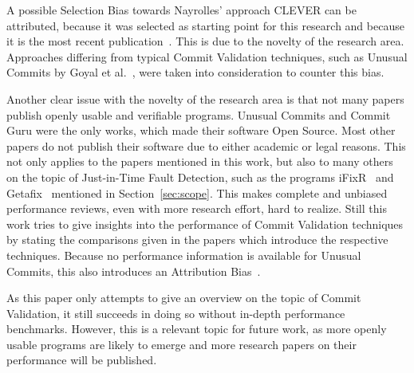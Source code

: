 A possible Selection Bias towards Nayrolles' approach CLEVER can be attributed, because it was selected as starting point for this research and because it is the most recent publication~\cite{Nayrolles2018}. This is due to the novelty of the research area. Approaches differing from typical Commit Validation techniques, such as Unusual Commits by Goyal et al.~\cite{Goyal2017}, were taken into consideration to counter this bias.

Another clear issue with the novelty of the research area is that not many papers publish openly usable and verifiable programs. Unusual Commits and Commit Guru were the only works, which made their software Open Source. Most other papers do not publish their software due to either academic or legal reasons. This not only applies to the papers mentioned in this work, but also to many others on the topic of Just-in-Time Fault Detection, such as the programs iFixR~\cite{Koyuncu2019} and Getafix~\cite{Bader2019} mentioned in Section~\ref{sec:scope}. This makes complete and unbiased performance reviews, even with more research effort, hard to realize. Still this work tries to give insights into the performance of Commit Validation techniques by stating the comparisons given in the papers which introduce the respective techniques. Because no performance information is available for Unusual Commits, this also introduces an Attribution Bias~\cite{Goyal2017}.

As this paper only attempts to give an overview on the topic of Commit Validation, it still succeeds in doing so without in-depth performance benchmarks. However, this is a relevant topic for future work, as more openly usable programs are likely to emerge and more research papers on their performance will be published.





